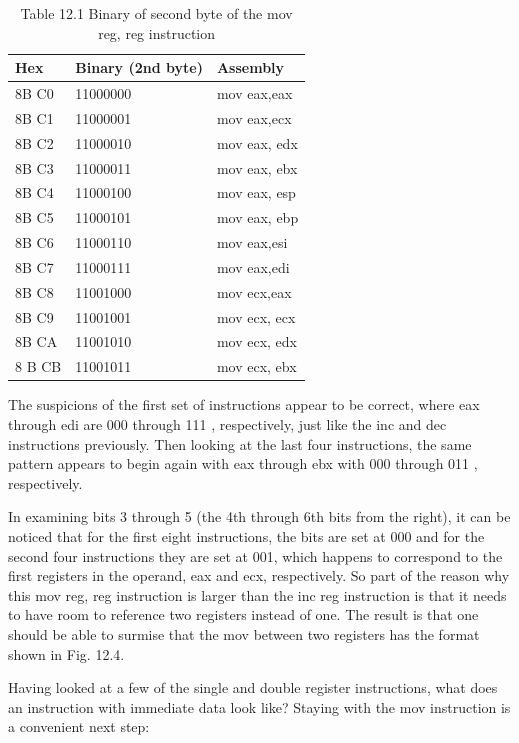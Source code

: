\documentclass[10pt]{article}
\begin{document}
\begin{table}[h]
\begin{center}
\captionsetup{labelformat=empty}
\caption{Table 12.1 Binary of second byte of the mov reg, reg instruction}
\begin{tabular}{|l|l|l|}
\hline
Hex & Binary (2nd byte) & Assembly \\
\hline
8B C0 & 11000000 & mov eax,eax \\
\hline
8B C1 & 11000001 & mov eax,ecx \\
\hline
8B C2 & 11000010 & mov eax, edx \\
\hline
8B C3 & 11000011 & mov eax, ebx \\
\hline
8B C4 & 11000100 & mov eax, esp \\
\hline
8B C5 & 11000101 & mov eax, ebp \\
\hline
8B C6 & 11000110 & mov eax,esi \\
\hline
8B C7 & 11000111 & mov eax,edi \\
\hline
8B C8 & 11001000 & mov ecx,eax \\
\hline
8B C9 & 11001001 & mov ecx, ecx \\
\hline
8B CA & 11001010 & mov ecx, edx \\
\hline
8 B CB & 11001011 & mov ecx, ebx \\
\hline
\end{tabular}
\end{center}
\end{table}

The suspicions of the first set of instructions appear to be correct, where eax through edi are 000 through 111 , respectively, just like the inc and dec instructions previously. Then looking at the last four instructions, the same pattern appears to begin again with eax through ebx with 000 through 011 , respectively.

In examining bits 3 through 5 (the 4th through 6th bits from the right), it can be noticed that for the first eight instructions, the bits are set at 000 and for the second four instructions they are set at 001, which happens to correspond to the first registers in the operand, eax and ecx, respectively. So part of the reason why this mov reg, reg instruction is larger than the inc reg instruction is that it needs to have room to reference two registers instead of one. The result is that one should be able to surmise that the mov between two registers has the format shown in Fig. 12.4.

Having looked at a few of the single and double register instructions, what does an instruction with immediate data look like? Staying with the mov instruction is a convenient next step:
\end{document}
